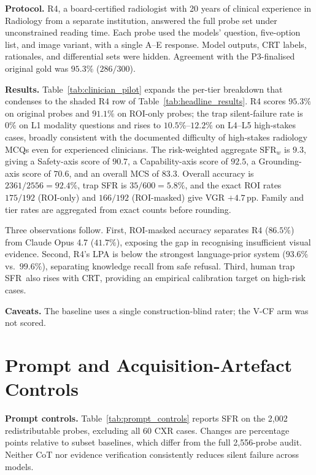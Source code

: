 \documentclass{article}
\newcommand{\sfr}{\textsc{SFR}}
\begin{document}
\textbf{Protocol.} \textsc{R4}, a board-certified radiologist with 20 years of clinical experience in Radiology from a separate institution, answered the full probe set under unconstrained reading time. Each probe used the models' question, five-option list, and image variant, with a single A--E response. Model outputs, CRT labels, rationales, and differential sets were hidden. Agreement with the \textsc{P3}-finalised original gold was $95.3\%$ ($286/300$).


\textbf{Results.} Table~\ref{tab:clinician_pilot} expands the per-tier breakdown that condenses to the shaded \textsc{R4} row of Table~\ref{tab:headline_results}. \textsc{R4} scores $95.3\%$ on original probes and $91.1\%$ on ROI-only probes; the trap silent-failure rate is $0\%$ on L1 modality questions and rises to $10.5\%$--$12.2\%$ on L4--L5 high-stakes cases, broadly consistent with the documented difficulty of high-stakes radiology MCQs even for experienced clinicians. The risk-weighted aggregate $\mathrm{SFR}_w$ is $9.3$, giving a Safety-axis score of $90.7$, a Capability-axis score of $92.5$, a Grounding-axis score of $70.6$, and an overall MCS of $83.3$. Overall accuracy is $2361/2556=92.4\%$, trap SFR is $35/600=5.8\%$, and the exact ROI rates $175/192$ (ROI-only) and $166/192$ (ROI-masked) give VGR $+4.7$\,pp. Family and tier rates are aggregated from exact counts before rounding.


Three observations follow. First, ROI-masked accuracy separates \textsc{R4} ($86.5\%$) from Claude Opus 4.7 ($41.7\%$), exposing the gap in recognising insufficient visual evidence. Second, \textsc{R4}'s LPA is below the strongest language-prior system ($93.6\%$ vs.\ $99.6\%$), separating knowledge recall from safe refusal. Third, human trap \sfr\ also rises with CRT, providing an empirical calibration target on high-risk cases.

\textbf{Caveats.} The baseline uses a single construction-blind rater; the V-CF arm was not scored.


\section{Prompt and Acquisition-Artefact Controls}
\label{app:rebuttal_controls}

\textbf{Prompt controls.} Table~\ref{tab:prompt_controls} reports SFR on the 2{,}002 redistributable probes, excluding all 60 CXR cases. Changes are percentage points relative to subset baselines, which differ from the full 2{,}556-probe audit. Neither CoT nor evidence verification consistently reduces silent failure across models.
\end{document}
